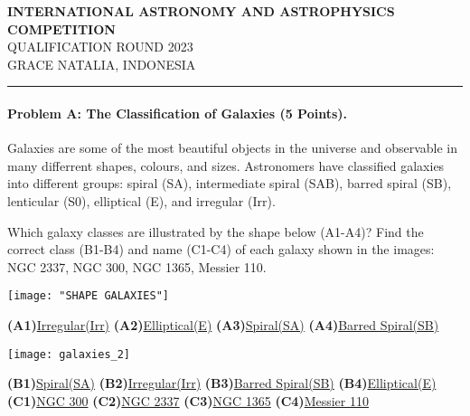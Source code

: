 \documentclass[12pt,times new roman, 2pt, a4paper]{report}
\begin{document}
\begin{center}
	\large\textbf{INTERNATIONAL ASTRONOMY AND ASTROPHYSICS COMPETITION}\\[14pt]
	\large{QUALIFICATION ROUND 2023}\\ [12pt]
	\small{GRACE NATALIA, INDONESIA}\\ [10pt]
\end{center}
\rule{\textwidth}{0.5pt}

\paragraph{Problem A: The Classification of Galaxies (5 Points).}
Galaxies are some of the most beautiful objects in the universe and observable in many differrent shapes, colours, and sizes. Astronomers have classified galaxies into different groups: spiral (SA), intermediate spiral (SAB), barred spiral (SB), lenticular (S0), elliptical (E), and irregular (Irr).

Which galaxy classes are illustrated by the shape below (A1-A4)? Find the correct class (B1-B4) and name (C1-C4) of each galaxy shown in the images: NGC 2337, NGC 300, NGC 1365, Messier 110.
\begin{center}
	\texttt{[image: "SHAPE GALAXIES"]}
\end{center}
\hspace{0.1in}\textbf{(A1)}\underline{Irregular(Irr)} \hspace{0.2in}\textbf{(A2)}\underline{Elliptical(E)}  \hspace{0.2in}\textbf{(A3)}\underline{Spiral(SA)} 
\hspace{0.2in}\textbf{(A4)}\underline{Barred Spiral(SB)}
\begin{center}
	\centering
	\texttt{[image: galaxies\_2]}
\end{center}
\hspace{0.25in}\textbf{(B1)}\underline{Spiral(SA)} 
\hspace{0.3in}\textbf{(B2)}\underline{Irregular(Irr)} 
\hspace{0.08in}\textbf{(B3)}\underline{Barred Spiral(SB)} 
\hspace{0.04in}\textbf{(B4)}\underline{Elliptical(E)}\\

\textbf{(C1)}\underline{NGC 300}  
\hspace{0.4in}\textbf{(C2)}\underline{NGC 2337}   
\hspace{0.25in}\textbf{(C3)}\underline{NGC 1365}   
\hspace{0.57in}\textbf{(C4)}\underline{Messier 110}
\end{document}
